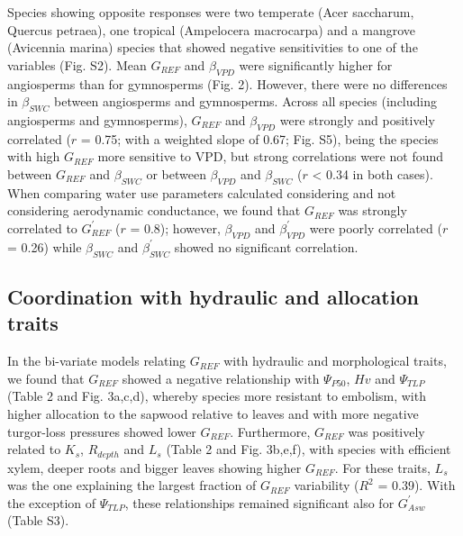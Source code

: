 \documentclass[11pt,twoside]{reedthesis}
\begin{document}
Species showing opposite responses were two temperate (Acer saccharum,
Quercus petraea), one tropical (Ampelocera macrocarpa) and a mangrove
(Avicennia marina) species that showed negative sensitivities to one of
the variables (Fig. S2). Mean \(G_{REF}\) and \(\beta_{VPD}\) were
significantly higher for angiosperms than for gymnosperms (Fig. 2).
However, there were no differences in \(\beta_{SWC}\) between
angiosperms and gymnosperms. Across all species (including angiosperms
and gymnosperms), \(G_{REF}\) and \(\beta_{VPD}\) were strongly and
positively correlated (\(r\) = 0.75; with a weighted slope of 0.67; Fig.
S5), being the species with high \(G_{REF}\) more sensitive to VPD, but
strong correlations were not found between \(G_{REF}\) and
\(\beta_{SWC}\) or between \(\beta_{VPD}\) and \(\beta_{SWC}\)
(\textbar{}\(r\)\textbar{} \textless{} 0.34 in both cases). When
comparing water use parameters calculated considering and not
considering aerodynamic conductance, we found that \(G_{REF}\) was
strongly correlated to \(G_{REF}^{'}\) (\(r\) = 0.8); however,
\(\beta_{VPD}\) and \(\beta_{VPD}^{'}\) were poorly correlated (\(r\) =
0.26) while \(\beta_{SWC}\) and \(\beta_{SWC}^{'}\) showed no
significant correlation.\par

\subsection{Coordination with hydraulic and allocation
traits}\label{coordination-with-hydraulic-and-allocation-traits}

In the bi-variate models relating \(G_{REF}\) with hydraulic and
morphological traits, we found that \(G_{REF}\) showed a negative
relationship with \textbar{}\(\Psi_{P50}\)\textbar{}, \(Hv\) and
\textbar{}\(\Psi_{TLP}\)\textbar{} (Table 2 and Fig. 3a,c,d), whereby
species more resistant to embolism, with higher allocation to the
sapwood relative to leaves and with more negative turgor-loss pressures
showed lower \(G_{REF}\). Furthermore, \(G_{REF}\) was positively
related to \(K_s\), \(R_{depth}\) and \(L_s\) (Table 2 and Fig. 3b,e,f),
with species with efficient xylem, deeper roots and bigger leaves
showing higher \(G_{REF}\). For these traits, \(L_s\) was the one
explaining the largest fraction of \(G_{REF}\) variability (\(R^2\) =
0.39). With the exception of \(\Psi_{TLP}\), these relationships
remained significant also for \(G_{Asw}^{'}\) (Table S3).\par
\end{document}
